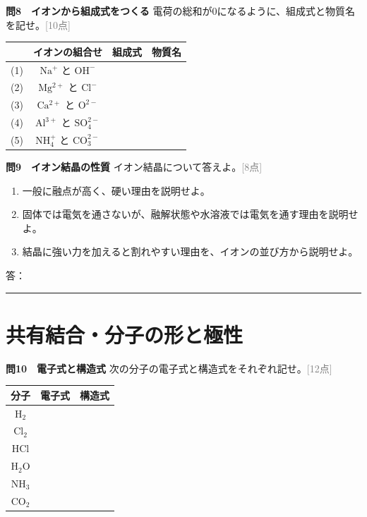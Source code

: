 \documentclass[11pt,a4paper]{ctexart}
\newcommand{\blank}[1]{\rule{#1}{0.4pt}}
\newcommand{\score}[1]{\hfill\textcolor{gray}{[#1点]}}
\newcommand{\ansspace}[1]{\par\vspace{#1}}
\newenvironment{qbox}{\begin{list}{}{\setlength{\leftmargin}{0pt}}\item\begin{minipage}{\linewidth}}{\end{minipage}\end{list}\vspace{3mm}}
\begin{document}
\begin{qbox}
\textbf{問8　イオンから組成式をつくる}
\quad 電荷の総和が0になるように、組成式と物質名を記せ。\score{10}
\begin{center}
\renewcommand{\arraystretch}{1.55}
\begin{tabularx}{\linewidth}{c|c|X|X}
\toprule
 & イオンの組合せ & 組成式 & 物質名\\ \midrule
(1)& $\mathrm{Na^+}$ と $\mathrm{OH^-}$ &&\\
(2)& $\mathrm{Mg^{2+}}$ と $\mathrm{Cl^-}$ &&\\
(3)& $\mathrm{Ca^{2+}}$ と $\mathrm{O^{2-}}$ &&\\
(4)& $\mathrm{Al^{3+}}$ と $\mathrm{SO_4^{2-}}$ &&\\
(5)& $\mathrm{NH_4^+}$ と $\mathrm{CO_3^{2-}}$ &&\\
\bottomrule
\end{tabularx}
\end{center}
\end{qbox}

\begin{qbox}
\textbf{問9　イオン結晶の性質}
\quad イオン結晶について答えよ。\score{8}
\begin{enumerate}[label=(\arabic*),leftmargin=9mm]
\item 一般に融点が高く、硬い理由を説明せよ。
\item 固体では電気を通さないが、融解状態や水溶液では電気を通す理由を説明せよ。
\item 結晶に強い力を加えると割れやすい理由を、イオンの並び方から説明せよ。
\end{enumerate}
答：\blank{150mm}\ansspace{11mm}
\end{qbox}

\section{共有結合・分子の形と極性}

\begin{qbox}
\textbf{問10　電子式と構造式}
\quad 次の分子の電子式と構造式をそれぞれ記せ。\score{12}
\begin{center}
\renewcommand{\arraystretch}{2.25}
\begin{tabularx}{\linewidth}{c|X|X}
\toprule
分子 & 電子式 & 構造式\\ \midrule
$\mathrm{H_2}$ &&\\
$\mathrm{Cl_2}$ &&\\
$\mathrm{HCl}$ &&\\
$\mathrm{H_2O}$ &&\\
$\mathrm{NH_3}$ &&\\
$\mathrm{CO_2}$ &&\\
\bottomrule
\end{tabularx}
\end{center}
\end{qbox}
\end{document}
